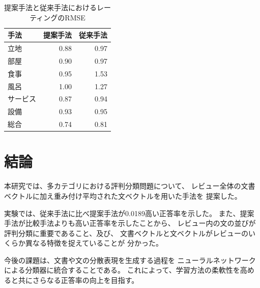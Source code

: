 \documentclass[twocolumn,a4paper]{ltjarticle}
\begin{document}
\begin{table}[b!]
  \caption{提案手法と従来手法\cite{fujitani15}におけるレーティングのRMSE}
  \centering
  \begin{tabular}{l | r r} \label{tab:RMSEs}
    手法 & 提案手法 & 従来手法\cite{fujitani15} \\
    \hline
    立地      & 0.88 & 0.97 \\
    部屋      & 0.90 & 0.97 \\
    食事      & 0.95 & 1.53 \\
    風呂      & 1.00 & 1.27 \\
    サービス  & 0.87 & 0.94 \\
    設備      & 0.93 & 0.95 \\
    総合      & 0.74 & 0.81 \\
  \end{tabular}
\end{table}



\section{結論}

本研究では、多カテゴリにおける評判分類問題について、
レビュー全体の文書ベクトルに加え重み付け平均された文ベクトルを用いた手法を
提案した。

実験では、従来手法\cite{fujitani15}に比べ提案手法が0.0189高い正答率を示した。
また、提案手法が比較手法よりも高い正答率を示したことから、
レビュー内の文の並びが評判分類に重要であること、及び、
文書ベクトルと文ベクトルがレビューのいくらか異なる特徴を捉えていることが
分かった。

今後の課題は、文書や文の分散表現を生成する過程を
ニューラルネットワークによる分類器に統合することである。
これによって、学習方法の柔軟性を高めると共にさらなる正答率の向上を目指す。

%
%
\end{document}
